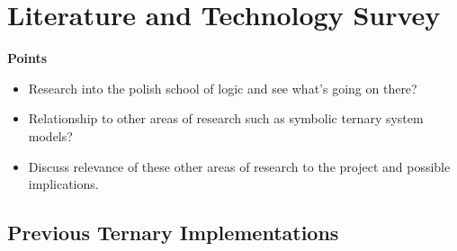 \documentclass[12pt]{article}
\begin{document}
\section{Literature and Technology Survey}

\textbf{Points}
\begin{itemize}
    \item Research into the polish school of logic and see what's going on there?
    \item Relationship to other areas of research such as symbolic ternary system models?
    \item Discuss relevance of these other areas of research to the project and possible implications.
\end{itemize}

\subsection{Previous Ternary Implementations}
\end{document}
